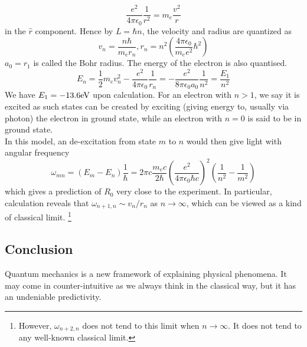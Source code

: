 $$\frac{e^2}{4\pi\epsilon_0}\frac{1}{r^2}=m_e\frac{v^2}{r}$$
in the $\hat{r}$ component.
Hence by $L=\hbar n$, the velocity and radius are quantized as
$$v_n=\frac{n\hbar}{m_e r_n},r_n=n^2\left( \frac{4\pi\epsilon_0}{m_ee^2}\hbar^2 \right)$$
$a_0=r_1$ is called the Bohr radius.
The energy of the electron is also quantised.
$$E_n=\frac{1}{2}m_ev_n^2-\frac{e^2}{4\pi\epsilon_0}\frac{1}{r_n}=-\frac{e^2}{8\pi\epsilon_0a_0}\frac{1}{n^2}=\frac{E_1}{n^2}$$
We have $E_1=-13.6{\rm eV}$ upon calculation.
For an electron with $n>1$, we say it is excited as such states can be created by exciting (giving energy to, usually via photon) the electron in ground state, while an electron with $n=0$ is said to be in ground state.\\
In this model, an de-excitation from state $m$ to $n$ would then give light with angular frequency
$$\omega_{mn}=(E_m-E_n)\frac{1}{\hbar}=2\pi c\frac{m_ec}{2\hbar}\left(\frac{e^2}{4\pi\epsilon_0\hbar c}\right)^2\left( \frac{1}{n^2}-\frac{1}{m^2} \right)$$
which gives a prediction of $R_0$ very close to the experiment.
In particular, calculation reveals that $\omega_{n+1,n}\sim v_n/r_n$ as $n\to\infty$, which can be viewed as a kind of classical limit.
\footnote{However, $\omega_{n+2,n}$ does not tend to this limit when $n\to\infty$. It does not tend to any well-known classical limit.}
\subsection{Conclusion}
Quantum mechanics is a new framework of explaining physical phenomena.
It may come in counter-intuitive as we always think in the classical way, but it has an undeniable predictivity.